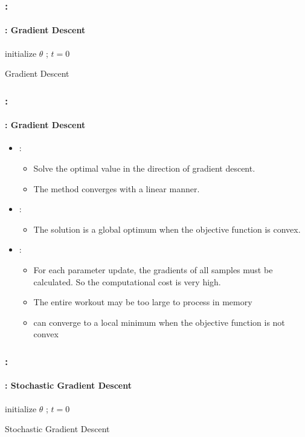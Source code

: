 \documentclass[xcolor=table]{beamer}
\begin{document}
\begin{frame}
	\frametitle{\insertshortsubtitle: \insertsection}
	\framesubtitle{\insertsubsection: Gradient Descent}
	
	\begin{algorithm}[H]
		\KwResult{$ \theta $}
		initialize $ \theta $ ; $ t = 0 $\;
		\caption{Gradient Descent}
	\end{algorithm}

\end{frame}

\begin{frame}
	\frametitle{\insertshortsubtitle: \insertsection}
	\framesubtitle{\insertsubsection: Gradient Descent}
	
	\begin{itemize}
		\item {}:
		\begin{itemize}
			\item Solve the optimal value in the direction of gradient descent.
			\item The method converges with a linear manner.
		\end{itemize}
		\item {}:
		\begin{itemize}
			\item The solution is a global optimum when the objective function is convex.
		\end{itemize}
		\item {}:
		\begin{itemize}
			\item For each parameter update, the gradients of all samples must be calculated. So the computational cost is very high.
			\item The entire workout may be too large to process in memory
			\item can converge to a local minimum when the objective function is not convex
		\end{itemize}
	\end{itemize}

\end{frame}

\begin{frame}
	\frametitle{\insertshortsubtitle: \insertsection}
	\framesubtitle{\insertsubsection: Stochastic Gradient Descent}
	
	\begin{algorithm}[H]
		\KwResult{$ \theta $}
		initialize $ \theta $ ; $ t = 0 $\;
		\caption{Stochastic Gradient Descent}
	\end{algorithm}

\end{frame}
\end{document}
